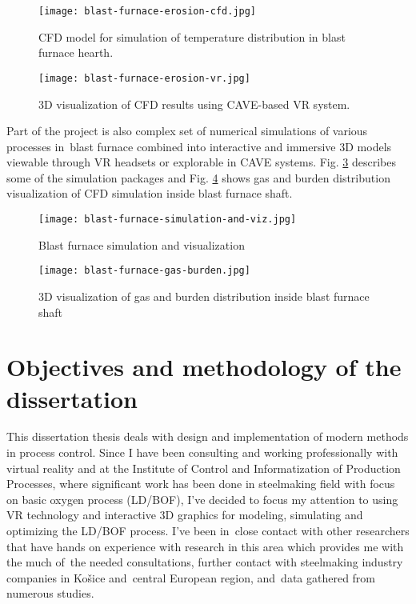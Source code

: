 \begin{figure}[h!]
	\centering
	\texttt{[image: blast-furnace-erosion-cfd.jpg]}
	\caption{CFD model for simulation of temperature distribution in blast furnace hearth.}
	\label{o:m6}
\end{figure}

\begin{figure}[h!]
	\centering
	\texttt{[image: blast-furnace-erosion-vr.jpg]}
	\caption{3D visualization of CFD results using CAVE-based VR system.}
	\label{o:m7}
\end{figure}

Part of the project is also complex set of numerical simulations of various processes in~blast furnace combined into interactive and immersive 3D models viewable through VR headsets or explorable in CAVE systems. Fig. \ref{o:m9} describes some of the simulation packages and Fig. \ref{o:m10} shows gas and burden distribution visualization of CFD simulation inside blast furnace shaft.

\begin{figure}
	\centering
	\texttt{[image: blast-furnace-simulation-and-viz.jpg]}
	\caption{Blast furnace simulation and visualization}
	\label{o:m9}
\end{figure}

\begin{figure}
	\centering
	\texttt{[image: blast-furnace-gas-burden.jpg]}
	\caption{3D visualization of gas and burden distribution inside blast furnace shaft}
	\label{o:m10}
\end{figure}

\newpage
\section{Objectives and methodology of the dissertation}
\label{section:3}
This dissertation thesis deals with design and implementation of modern methods in process control. Since I have been consulting and working professionally with virtual reality and at the Institute of Control and Informatization of Production Processes, where significant work has been done in steelmaking field with focus on basic oxygen process (LD/BOF), I've decided to focus my attention to using VR technology and interactive 3D graphics for modeling, simulating and optimizing the LD/BOF process. I've been in~close contact with other researchers that have hands on experience with research in this area \citep{Kacur2019,Sprava2018} which provides me with the much of~the needed consultations, further contact with steelmaking industry companies in Košice and~central European region, and~data gathered from numerous studies.

